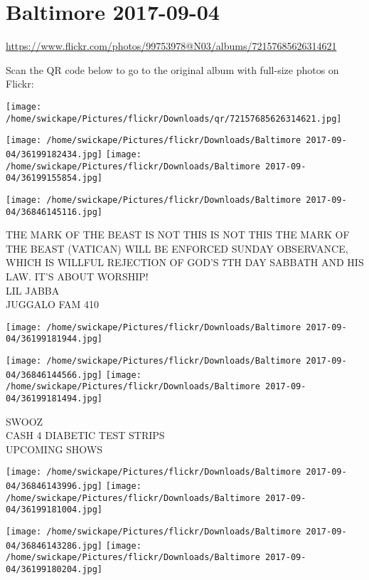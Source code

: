\documentclass[10pt,letterpaper]{article}
\title{}
\author{}
\date{}
\begin{document}
\section*{Baltimore 2017-09-04}

\url{https://www.flickr.com/photos/99753978@N03/albums/72157685626314621}

Scan the QR code below to go to the original album with full-size photos on Flickr:

\texttt{[image: /home/swickape/Pictures/flickr/Downloads/qr/72157685626314621.jpg]}
\pagebreak

\texttt{[image: /home/swickape/Pictures/flickr/Downloads/Baltimore 2017-09-04/36199182434.jpg]}
\texttt{[image: /home/swickape/Pictures/flickr/Downloads/Baltimore 2017-09-04/36199155854.jpg]}

\vspace{0.25in}
\texttt{[image: /home/swickape/Pictures/flickr/Downloads/Baltimore 2017-09-04/36846145116.jpg]}

THE MARK OF THE BEAST IS NOT THIS IS NOT THIS THE MARK OF THE BEAST (VATICAN) WILL BE ENFORCED SUNDAY OBSERVANCE, WHICH IS WILLFUL REJECTION OF GOD'S 7TH DAY SABBATH AND HIS LAW.  IT'S ABOUT WORSHIP!\\
LIL JABBA\\
JUGGALO FAM 410
\pagebreak

\texttt{[image: /home/swickape/Pictures/flickr/Downloads/Baltimore 2017-09-04/36199181944.jpg]}

\vspace{0.25in}
\texttt{[image: /home/swickape/Pictures/flickr/Downloads/Baltimore 2017-09-04/36846144566.jpg]}
\texttt{[image: /home/swickape/Pictures/flickr/Downloads/Baltimore 2017-09-04/36199181494.jpg]}

SWOOZ\\
CASH 4 DIABETIC TEST STRIPS\\
UPCOMING SHOWS
\pagebreak

\texttt{[image: /home/swickape/Pictures/flickr/Downloads/Baltimore 2017-09-04/36846143996.jpg]}
\texttt{[image: /home/swickape/Pictures/flickr/Downloads/Baltimore 2017-09-04/36199181004.jpg]}

\texttt{[image: /home/swickape/Pictures/flickr/Downloads/Baltimore 2017-09-04/36846143286.jpg]}
\texttt{[image: /home/swickape/Pictures/flickr/Downloads/Baltimore 2017-09-04/36199180204.jpg]}
\end{document}
